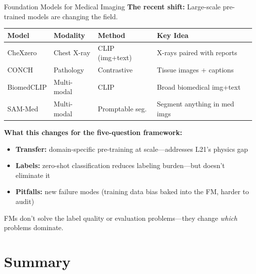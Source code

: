 \documentclass[aspectratio=169,10pt]{beamer}
\begin{document}
\begin{frame}{Foundation Models for Medical Imaging}
\textbf{The recent shift:} Large-scale pre-trained models are changing the field.

\begin{center}
{\footnotesize
\renewcommand{\arraystretch}{1.05}
\begin{tabular}{p{2.2cm}p{2.3cm}p{2.3cm}p{3.3cm}}
\toprule
\textbf{Model} & \textbf{Modality} & \textbf{Method} & \textbf{Key Idea} \\
\midrule
CheXzero & Chest X-ray & CLIP (img+text) & X-rays paired with reports \\
CONCH & Pathology & Contrastive & Tissue images + captions \\
BiomedCLIP & Multi-modal & CLIP & Broad biomedical img+text \\
SAM-Med & Multi-modal & Promptable seg. & Segment anything in med imgs \\
\bottomrule
\end{tabular}
}
\end{center}
\textbf{What this changes for the five-question framework:}
\begin{itemize}[<+->]
    \item \textbf{Transfer:} domain-specific pre-training at scale---addresses L21's physics gap
    \item \textbf{Labels:} zero-shot classification reduces labeling burden---but doesn't eliminate it
    \item \textbf{Pitfalls:} new failure modes (training data bias baked into the FM, harder to audit)
\end{itemize}

{\small FMs don't solve the label quality or evaluation problems---they change \emph{which} problems dominate.}
\end{frame}

\section{Summary}
\end{document}
